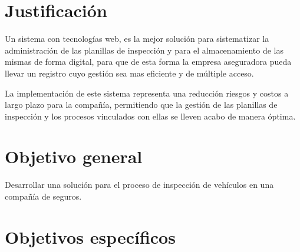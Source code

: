 


\setlength{\parskip}{0mm}





\section{Justificación} 
\setlength{\parskip}{5mm}

Un sistema con tecnologías web, es la mejor solución para sistematizar la administración de las planillas de inspección y para el almacenamiento de las mismas de forma digital, para que de esta forma la empresa aseguradora pueda llevar un registro cuyo gestión sea mas eficiente y de múltiple acceso.

La implementación de este sistema representa una reducción riesgos y costos a largo plazo para la compañía, permitiendo que la gestión de las planillas de inspección y los procesos vinculados con ellas se lleven acabo de manera óptima.
\setlength{\parskip}{0mm}

\section{Objetivo general} 

Desarrollar una solución para el proceso de inspección de vehículos en una compañía de seguros.


\section{Objetivos específicos}


